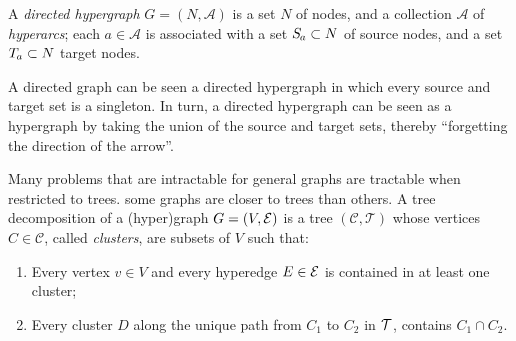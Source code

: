 \documentclass[twoside]{article}
\begin{document}
\begin{defn}
    A \emph{directed hypergraph} $G = (N, \mathcal A)$ is a set $N$ of nodes, and a collection $\mathcal A$ of \emph{hyperarcs}; each $a \in \mathcal A$
    is associated with a set $\Src a \subset N$ of source nodes, and a set $\Tgt a \subset N$ target nodes.
\end{defn}
A directed graph can be seen a directed hypergraph in which every source and target set is a singleton.
In turn, a directed hypergraph can be seen as a hypergraph
by taking the union of the source and target sets,
thereby ``forgetting the direction of the arrow''.

Many problems that are intractable for general graphs
are tractable when restricted to trees.
some graphs are closer to trees than others.
%
A tree decomposition of a (hyper)graph $G = (V, \mathcal E)$ is a tree $(\mathcal C, \mathcal T)$ whose vertices $C \in \mathcal C$, called
\emph{clusters}, are subsets of $V$ such that:

\begin{enumerate}[itemsep=0pt]
    \item Every vertex $v \in V$ and every hyperedge $E \in \mathcal E$ is contained in at least one cluster;
        \item Every cluster $D$ along the unique path from $C_1$ to $C_2$ in $\cal T$,
         contains $C_1 \cap C_2$.
\end{enumerate}
\end{document}
